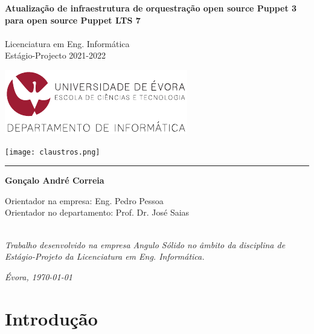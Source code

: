 \documentclass{article}
\begin{document}
\begin{titlepage}

\begin{minipage}{0.7\textwidth}
\noindent\LARGE\textbf{Atualização de infraestrutura de orquestração open source Puppet 3 para open source Puppet LTS 7\\\\}
\Large{Licenciatura em Eng. Informática\\}
\large{Estágio-Projecto 2021-2022\\}
\end{minipage}
\begin{minipage}[t]{0.3\textwidth}\raggedleft
\includegraphics[width=.9\linewidth]{di.pdf}
\end{minipage}
\noindent
\texttt{[image: claustros.png]}\\

\vspace{0.5cm}
\noindent\textcolor{castanho-ue}{\rule{\textwidth}{0.03cm}}

\vspace{0.5cm}
\noindent\large\textbf{Gonçalo André Correia\\}

\noindent
Orientador na empresa: Eng. Pedro Pessoa\\     
Orientador no departamento: Prof. Dr. José Saias

\emph{\\Trabalho desenvolvido na empresa Angulo Sólido no âmbito da disciplina de Estágio-Projeto da Licenciatura em Eng. Informática.}\\ 

\begin{flushright}
\emph{Évora, \today}
\end{flushright}

\end{titlepage}


\cleardoublepage
\tableofcontents

\cleardoublepage
{}
\section{Introdução}
\end{document}
